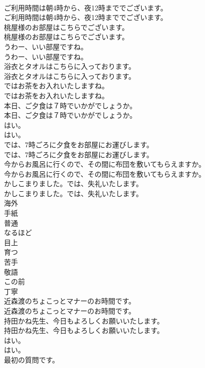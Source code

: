 \documentclass[8pt]{extreport}
\begin{document}
\begin{CJK}{UTF8}{min}
\\	ご利用時間は朝4時から、夜12時まででございます。	
\\	ご利用時間は朝4時から、夜12時まででございます。 
\\	桃屋様のお部屋はこちらでございます。	
\\	桃屋様のお部屋はこちらでございます。 
\\	うわー、いい部屋ですね。	
\\	うわー、いい部屋ですね。 
\\	浴衣とタオルはこちらに入っております。	
\\	浴衣とタオルはこちらに入っております。 
\\	ではお茶をお入れいたしますね。	
\\	ではお茶をお入れいたしますね。 
\\	本日、ご夕食は７時でいかがでしょうか。	
\\	本日、ご夕食は７時でいかがでしょうか。 
\\	はい。	
\\	はい。 
\\	では、7時ごろに夕食をお部屋にお運びします。	
\\	では、7時ごろに夕食をお部屋にお運びします。 
\\	今からお風呂に行くので、その間に布団を敷いてもらえますか。	
\\	今からお風呂に行くので、その間に布団を敷いてもらえますか。 
\\	かしこまりました。では、失礼いたします。	
\\	かしこまりました。では、失礼いたします。 
\\	海外
\\	手紙
\\	普通
\\	なるほど
\\	目上
\\	育つ
\\	苦手
\\	敬語
\\	この前
\\	丁寧
\\	近森渡のちょこっとマナーのお時間です。	
\\	近森渡のちょこっとマナーのお時間です。 
\\	持田かね先生、今日もよろしくお願いいたします。	
\\	持田かね先生、今日もよろしくお願いいたします。 
\\	はい。	
\\	はい。 
\\	最初の質問です。	

\end{CJK}
\end{document}
